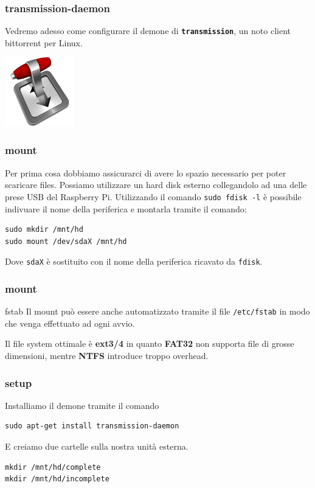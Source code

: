 \documentclass[xcolor=svgnames,11pt]{beamer}
\begin{document}
\begin{frame}\frametitle{transmission-daemon}
Vedremo adesso come configurare il demone di \texttt{\textbf{transmission}}, un noto client bittorrent per Linux.
\medskip
\begin{center}
\includegraphics[width=3cm]{transmission-icon.png}
\end{center}
\end{frame}

\begin{frame}[fragile]\frametitle{mount}
Per prima cosa dobbiamo assicurarci di avere lo spazio necessario per poter scaricare files. Possiamo utilizzare un hard disk esterno collegandolo ad una delle prese USB del Raspberry Pi.
\medskip
Utilizzando il comando \texttt{sudo fdisk -l} \`e possibile indivuare il nome della periferica e montarla tramite il comando:
\begin{block}{}
\begin{verbatim}
sudo mkdir /mnt/hd
sudo mount /dev/sdaX /mnt/hd
\end{verbatim}
\end{block}

\medskip
Dove \texttt{sdaX} \`e sostituito con il nome della periferica ricavato da \texttt{fdisk}.
\end{frame}

\begin{frame}\frametitle{mount}
\begin{block}{fstab}
Il mount pu\`o essere anche automatizzato tramite il file \texttt{/etc/fstab} in modo che venga effettuato ad ogni avvio.  
\end{block}

Il file system ottimale \`e \textbf{ext3/4} in quanto \textbf{FAT32} non supporta file di grosse dimensioni, mentre \textbf{NTFS} introduce troppo overhead.
\end{frame}

\begin{frame}[fragile]\frametitle{setup}
Installiamo il demone tramite il comando
\begin{block}{}
\begin{verbatim}
sudo apt-get install transmission-daemon
\end{verbatim}
\end{block}
\medskip
E creiamo due cartelle sulla nostra unit\`a esterna.
\begin{block}{}
\begin{verbatim}
mkdir /mnt/hd/complete
mkdir /mnt/hd/incomplete
\end{verbatim}
\end{block}
\end{frame}
\end{document}
